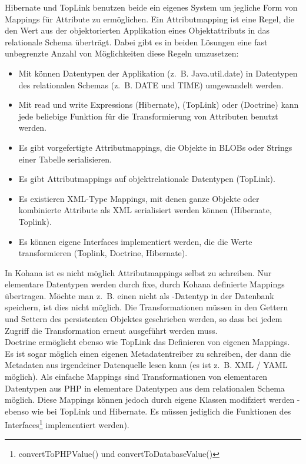 Hibernate und TopLink benutzen beide ein eigenes System um jegliche Form von Mappings für Attribute zu ermöglichen. Ein Attributmapping ist eine Regel, die den Wert aus der objektorierten Applikation eines Objektattributs in das relationale Schema überträgt. Dabei gibt es in beiden Lösungen eine fast unbegrenzte Anzahl von Möglichkeiten diese Regeln umzusetzen:
\begin{itemize}
\item Mit  können Datentypen der Applikation (z.~B. Java.util.date) in Datentypen des relationalen Schemas (z.~B. DATE und TIME) umgewandelt werden.
\item Mit read und write Expressions (Hibernate),  (TopLink) oder  (Doctrine) kann jede beliebige Funktion für die Transformierung von Attributen benutzt werden.
\item Es gibt vorgefertigte Attributmappings, die Objekte in BLOBs oder Strings einer Tabelle serialisieren.
\item Es gibt Attributmappings auf objektrelationale Datentypen (TopLink).
\item Es existieren XML-Type Mappings, mit denen ganze Objekte oder kombinierte Attribute als XML serialisiert werden können (Hibernate, Toplink).
\item Es können eigene Interfaces implementiert werden, die die Werte transformieren (Toplink, Doctrine, Hibernate).
\end{itemize}
In Kohana ist es nicht möglich Attributmappings selbst zu schreiben. Nur elementare Datentypen werden durch fixe, durch Kohana definierte Mappings übertragen. Möchte man z.~B. einen  nicht als -Datentyp in der Datenbank speichern, ist dies nicht möglich. Die Transformationen müssen in den Gettern und Settern des persistenten Objektes geschrieben werden, so dass bei jedem Zugriff die Transformation erneut ausgeführt werden muss.\\
Doctrine ermöglicht ebenso wie TopLink das Definieren von eigenen Mappings. Es ist sogar möglich einen eigenen Metadatentreiber zu schreiben, der dann die Metadaten aus irgendeiner Datenquelle lesen kann (es ist z.~B. XML / YAML möglich). Als einfache Mappings sind Transformationen von elementaren Datentypen aus PHP in elementare Datentypen aus dem relationalen Schema möglich. Diese Mappings können jedoch durch eigene Klassen modifziert werden - ebenso wie bei TopLink und Hibernate. Es müssen jediglich die Funktionen des Interfaces\footnote{convertToPHPValue() und convertToDatabaseValue()} implementiert werden).

